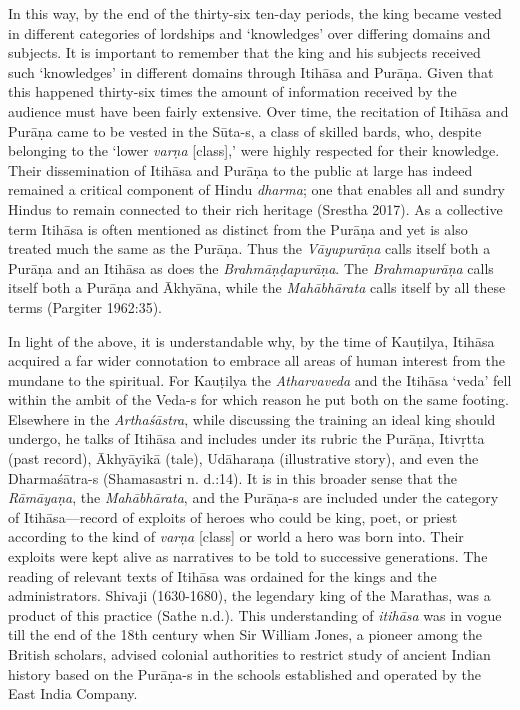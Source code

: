 In this way, by the end of the thirty-six ten-day periods, the king became vested in different categories of lordships and ‘knowledges’ over differing domains and subjects. It is important to remember that the king and his subjects received such ‘knowledges’ in different domains through Itihāsa and Purāṇa. Given that this happened thirty-six times the amount of information received by the audience must have been fairly extensive. Over time, the recitation of Itihāsa and Purāṇa came to be vested in the Sūta-s, a class of skilled bards, who, despite belonging to the ‘lower \textit{varṇa} [class],’ were highly respected for their knowledge. Their dissemination of Itihāsa and Purāṇa to the public at large has indeed remained a critical component of Hindu \textit{dharma}; one that enables all and sundry Hindus to remain connected to their rich heritage (Srestha 2017). As a collective term Itihāsa is often mentioned as distinct from the Purāṇa and yet is also treated much the same as the Purāṇa. Thus the \textit{Vāyupurāṇa} calls itself both a Purāṇa and an Itihāsa as does the \textit{Brahmāṇḍapurāṇa}. The \textit{Brahmapurāṇa} calls itself both a Purāṇa and Ākhyāna, while the \textit{Mahābhārata} calls itself by all these terms (Pargiter 1962:35). 

In light of the above, it is understandable why, by the time of Kauṭilya, Itihāsa acquired a far wider connotation to embrace all areas of human interest from the mundane to the spiritual. For Kauṭilya the \textit{Atharvaveda} and the Itihāsa ‘veda’ fell within the ambit of the Veda-s for which reason he put both on the same footing. Elsewhere in the \textit{Arthaśāstra}, while discussing the training an ideal king should undergo, he talks of Itihāsa and includes under its rubric the Purāṇa, Itivṛtta (past record), Ākhyāyikā (tale), Udāharaṇa (illustrative story), and even the Dharmaśātra-s (Shamasastri n. d.:14). It is in this broader sense that the \textit{Rāmāyaṇa}, the \textit{Mahābhārata}, and the Purāṇa-s are included under the category of Itihāsa—record of exploits of heroes who could be king, poet, or priest according to the kind of \textit{varṇa} [class] or world a hero was born into. Their exploits were kept alive as narratives to be told to successive generations. The reading of relevant texts of Itihāsa was ordained for the kings and the administrators. Shivaji (1630-1680), the legendary king of the Marathas, was a product of this practice (Sathe n.d.). This understanding of \textit{itihāsa} was in vogue till the end of the 18th century when Sir William Jones, a pioneer among the British scholars, advised colonial authorities to restrict study of ancient Indian history based on the Purāṇa-s in the schools established and operated by the East India Company.

